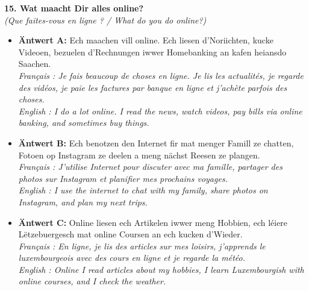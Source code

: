 \noindent\textbf{15. Wat maacht Dir alles online?}\\
\textit{(Que faites-vous en ligne ? / What do you do online?)}
\begin{itemize}
    \item \textbf{Äntwert A:} Ech maachen vill online. Ech liesen d'Noriichten, kucke Videoen, bezuelen d'Rechnungen iwwer Homebanking an kafen heiansdo Saachen.\\
    \textit{Français : Je fais beaucoup de choses en ligne. Je lis les actualités, je regarde des vidéos, je paie les factures par banque en ligne et j'achète parfois des choses.}\\
    \textit{English : I do a lot online. I read the news, watch videos, pay bills via online banking, and sometimes buy things.}
    \item \textbf{Äntwert B:} Ech benotzen den Internet fir mat menger Famill ze chatten, Fotoen op Instagram ze deelen a meng nächst Reesen ze plangen.\\
    \textit{Français : J'utilise Internet pour discuter avec ma famille, partager des photos sur Instagram et planifier mes prochains voyages.}\\
    \textit{English : I use the internet to chat with my family, share photos on Instagram, and plan my next trips.}
    \item \textbf{Äntwert C:} Online liesen ech Artikelen iwwer meng Hobbien, ech léiere Lëtzebuergesch mat online Coursen an ech kucken d'Wieder.\\
    \textit{Français : En ligne, je lis des articles sur mes loisirs, j'apprends le luxembourgeois avec des cours en ligne et je regarde la météo.}\\
    \textit{English : Online I read articles about my hobbies, I learn Luxembourgish with online courses, and I check the weather.}
\end{itemize}
\vspace{0.5em}

